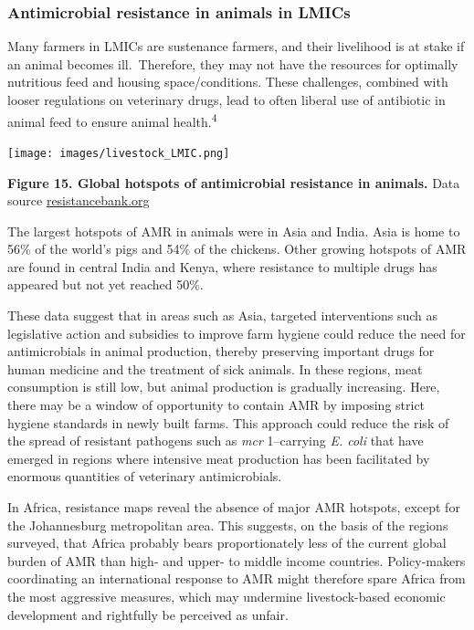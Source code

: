 \documentclass[
  11pt,
  paper=a4,
  ,captions=tableheading
]{scrartcl}
\begin{document}
\hypertarget{antimicrobial-resistance-in-animals-in-lmics}{%
\subsubsection*{Antimicrobial resistance in animals in
LMICs}\label{antimicrobial-resistance-in-animals-in-lmics}}

Many farmers in LMICs are sustenance farmers, and their livelihood is at
stake if an animal becomes ill.~Therefore, they may not have the
resources for optimally nutritious feed and housing space/conditions.
These challenges, combined with looser regulations on veterinary drugs,
lead to often liberal use of antibiotic in animal feed to ensure animal
health.\textsuperscript{4}

\texttt{[image: images/livestock\_LMIC.png]}

\textbf{Figure 15. Global hotspots of antimicrobial resistance in
animals.} Data source
\href{https://resistancebank.org/}{resistancebank.org}

The largest hotspots of AMR in animals were in Asia and India. Asia is
home to 56\% of the world's pigs and 54\% of the chickens. Other growing
hotspots of AMR are found in central India and Kenya, where resistance
to multiple drugs has appeared but not yet reached 50\%.

These data suggest that in areas such as Asia, targeted interventions
such as legislative action and subsidies to improve farm hygiene could
reduce the need for antimicrobials in animal production, thereby
preserving important drugs for human medicine and the treatment of sick
animals. In these regions, meat consumption is still low, but animal
production is gradually increasing. Here, there may be a window of
opportunity to contain AMR by imposing strict hygiene standards in newly
built farms. This approach could reduce the risk of the spread of
resistant pathogens such as \emph{mcr} 1--carrying \emph{E. coli} that
have emerged in regions where intensive meat production has been
facilitated by enormous quantities of veterinary antimicrobials.

In Africa, resistance maps reveal the absence of major AMR hotspots,
except for the Johannesburg metropolitan area. This suggests, on the
basis of the regions surveyed, that Africa probably bears
proportionately less of the current global burden of AMR than high- and
upper- to middle income countries. Policy-makers coordinating an
international response to AMR might therefore spare Africa from the most
aggressive measures, which may undermine livestock-based economic
development and rightfully be perceived as unfair.
\end{document}
